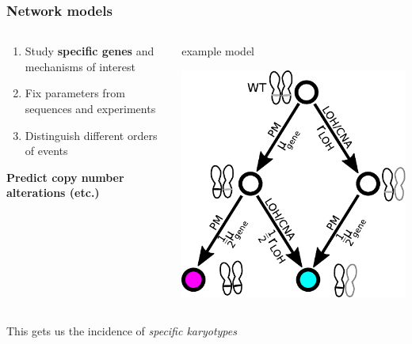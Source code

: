 \documentclass{beamer}
\begin{document}
%

\begin{frame}
    \frametitle{Network models}
    \begin{columns}
        \begin{column}{0.5\textwidth}
        \begin{enumerate}
            \item Study \textbf{specific genes} and mechanisms of interest
            \item Fix parameters from sequences and experiments
            \item Distinguish different orders of events
        \end{enumerate}
        \begin{center}
            \textbf{Predict copy number alterations (etc.)}
        \end{center}
        \end{column}
        \begin{column}{0.5\textwidth}
        \begin{center}
            \small{example model}
        \end{center}
            \includegraphics[width=\textwidth]{figures/diagram4}
        \end{column}
    \end{columns}

    \;

    \begin{center}
        This gets us the incidence of \emph{specific karyotypes}
    \end{center}
\end{frame}
\end{document}
